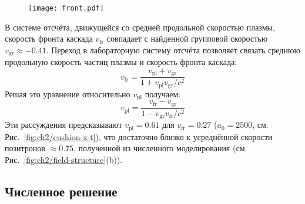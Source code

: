 \begin{figure}[h!]
	\texttt{[image: front.pdf]}
    \caption{\label{front} }
\end{figure}

В системе отсчёта, движущейся со средней продольной скоростью плазмы, скорость фронта каскада $v_\mathrm{fr}$ совпадает с найденной групповой скоростью $v_\mathrm{gr} \approx -0.41$.
Переход в лабораторную систему отсчёта позволяет связать среднюю продольную скорость частиц плазмы и скорость фронта каскада:
\begin{equation}
    v_\mathrm{fr}=\frac{v_\mathrm{pl}+v_\mathrm{gr}}{1+ v_\mathrm{pl} v_\mathrm{gr} /c^2} 
\label{vcf}
\end{equation}
Решая это уравнение относительно $v_\mathrm{pl}$ получаем:
\begin{equation}
    \label{vpl}
    v_\mathrm{pl}=\frac{v_\mathrm{fr}-v_\mathrm{gr}}{1-v_\mathrm{gr}v_\mathrm{fr}/c^2} 
\end{equation}
Эти рассуждения предсказывают $v_\mathrm{pl}=0.61$ для $v_\mathrm{fr} = 0.27$ ($a_{0}=2500$, см. Рис.~\ref{fig:ch2/cushion-x-t}), что достаточно близко к усреднённой скорости позитронов $\approx 0.75$, полученной из численного моделирования (см. Рис.~\ref{fig:ch2/field-structure}(b)).

\subsection{Численное решение}
\label{sub:ch2/sec3/Numeric}

